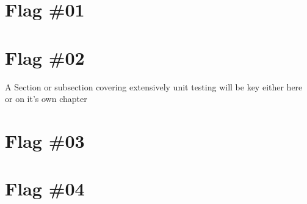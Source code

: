 
\section{Flag \#01}



\section{Flag \#02}

%

A Section or subsection covering extensively unit testing will be key either here or on it's own chapter
\newpage

\section{Flag \#03}

%
\newpage


\section{Flag \#04}


%

\newpage


